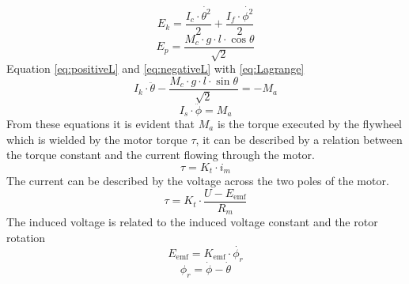 \documentclass[a4paper,11pt]{kth-mag}
\begin{document}
\begin{equation}
E_k = \frac{I_c \cdot \dot{\theta^2}}{2} + \frac{I_f \cdot \dot{\phi^2} }{2}
\end{equation}
\begin{equation}
E_p = \frac{M_c \cdot g \cdot l \cdot \cos \theta}{\sqrt{2}}
\end{equation}
Equation \eqref{eq:positiveL} and \eqref{eq:negativeL} with \eqref{eq:Lagrange}
\begin{equation} \label{eq:negativeL2}
I_k \cdot \ddot{\theta} - \frac{M_c \cdot g \cdot l \cdot \sin \theta }{\sqrt{2}}  = -M_a
\end{equation}
\begin{equation} \label{eq:postiveL2}
I_s \cdot \ddot{\phi} = M_a
\end{equation}
From these equations it is evident that $M_a$ is the torque executed by the flywheel which is wielded by the motor torque $\tau$, it can be described by a relation between the torque constant and the current flowing through the motor.
\begin{equation}
\tau = K_t \cdot i_m
\end{equation}
The current can be described by the voltage across the two poles of the motor. 
\begin{equation}
\tau = K_t \cdot \frac{U-E_{\text{emf}} }{R_m}
\end{equation}
The induced voltage is related to the induced voltage constant and the rotor rotation
\begin{equation}
E_{\text{emf}} = K_{\text{emf}} \cdot \dot{\phi_r}
\end{equation}
\begin{equation}
\phi_r = \dot{\phi} - \dot{\theta}
\end{equation}
 
\end{document}
